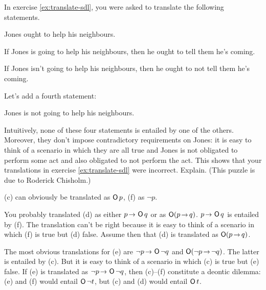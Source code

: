 \begin{exercise}\label{ex:chisholmsparadox}
  In exercise \ref{ex:translate-sdl}, you were asked to translate the following
  statements.
  \begin{exlist}
    \item[(c)] Jones ought to help his neighbours.
    \item[(d)] If Jones is going to help his neighbours, then he ought to tell them
    he's coming.
    \item[(e)] If Jones isn't going to help his neighbours, then he ought to not  tell them he's coming.
  \end{exlist}
  \medskip\noindent%
  Let's add a fourth statement:
  \begin{exlist}
    \item[(f)] Jones is not going to help his neighbours.
  \end{exlist}
  \medskip\noindent%
  Intuitively, none of these four statements is entailed by one of the others.
  Moreover, they don't impose contradictory requirements on Jones: it is easy to
  think of a scenario in which they are all true and Jones is not obligated to
  perform some act and also obligated to not perform the act. This shows that
  your translations in exercise \ref{ex:translate-sdl} were incorrect. Explain.
  (This puzzle is due to Roderick Chisholm.)
\end{exercise}
\begin{solution}
  (c) can obviously be translated as $\operatorname{\mathsf{O}} p$, (f) as $\neg p$.

  You probably translated (d) as either $p \to \Ob q$ or as $\Ob(p \to q)$.
  $p \to \Ob q$ is entailed by (f). The translation can't be
  right because it is easy to think of a scenario in which (f) is true but (d)
  false. Assume then that (d) is translated as $\Ob(p \to q)$.

  The most obvious translations for (e) are $\neg p \to \Ob\neg q$ and
  $\Ob(\neg p \to \neg q)$. The latter is entailed by (c). But it is easy to
  think of a scenario in which (c) is true but (e) false. If (e) is translated
  as $\neg p \to \Ob \neg q$, then (c)--(f) constitute a deontic dilemma: (e)
  and (f) would entail $\operatorname{\mathsf{O}} \neg t$, but (c) and (d) would entail $\operatorname{\mathsf{O}} t$.
\end{solution}


